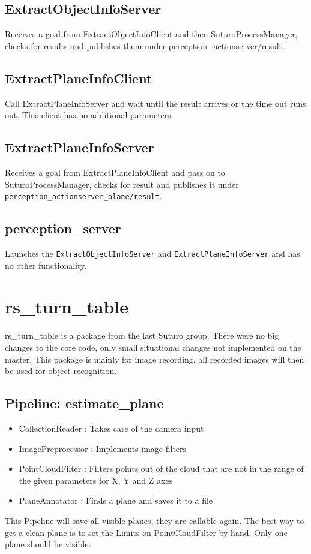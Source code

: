 \documentclass[main.tex]{subfiles}
\begin{document}
			\subsection{ExtractObjectInfoServer}
Receives a goal from ExtractObjectInfoClient and then SuturoProcessManager, checks for results and publishes them under perception\_actionserver/result. 

			\subsection{ExtractPlaneInfoClient}
Call ExtractPlaneInfoServer and wait until the result arrives or the time out runs out. This client has no additional parameters.

			\subsection{ExtractPlaneInfoServer}
Receives a goal from ExtractPlaneInfoClient and pass on to SuturoProcessManager, checks for result and publishes it under \texttt{perception\_actionserver\_plane/result}.

			\subsection{perception\_server}
Launches the \texttt{ExtractObjectInfoServer} and \texttt{ExtractPlaneInfoServer} and has no other functionality.

		\section{rs\_turn\_table}
rs\_turn\_table is a package from the last Suturo group. There were no big changes to the core code, only small situational changes not implemented on the master. 
This package is mainly for image recording, all recorded images will then be used for object recognition.  
			\subsection{Pipeline: estimate\_plane}
\begin{itemize}
	\item CollectionReader : Takes care of the camera input
	\item ImagePreprocessor : Implements image filters  
	\item PointCloudFilter : Filters points out of the cloud that are not in the range of the given parameters for X, Y and Z axes
	\item PlaneAnnotator : Finds a plane and saves it to a file 
\end{itemize}
This Pipeline will save all visible planes, they are callable again. The best way to get a clean plane is to set the Limits on PointCloudFilter by hand. Only one plane should be visible. 
\end{document}

